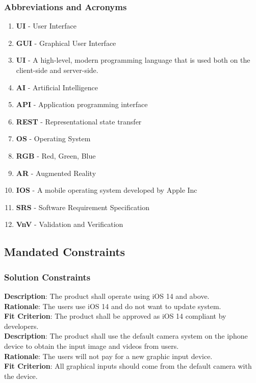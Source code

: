 \documentclass[12pt]{article}
\begin{document}
\subsubsection{Abbreviations and Acronyms}
\begin{enumerate}
\item \textbf{UI} - User Interface
\item \textbf{GUI} - Graphical User Interface
\item \textbf{UI} - A high-level, modern programming language that is used both on the client-side and server-side.
\item \textbf{AI} - Artificial Intelligence
\item \textbf{API} - Application programming interface
\item \textbf{REST} - Representational state transfer
\item \textbf{OS} - Operating System
\item \textbf{RGB} - Red, Green, Blue
\item \textbf{AR} - Augmented Reality
\item \textbf{IOS} - A mobile operating system developed by Apple Inc
\item \textbf{SRS} - Software Requirement Specification
\item \textbf{VnV} - Validation and Verification
\end{enumerate}

\subsection{Mandated Constraints}
\subsubsection{Solution Constraints}
\textbf{Description}: The product shall operate using iOS 14 and above. \\
\textbf{Rationale}: The users use iOS 14 and do not want to update system. \\
\textbf{Fit Criterion}: The product shall be approved as iOS 14 compliant by developers. \\
\newline
\textbf{Description}: The product shall use the default camera system on the iphone device to obtain the input image and videos from users. \\
\textbf{Rationale}: The users will not pay for a new graphic input device. \\
\textbf{Fit Criterion}: All graphical inputs should come from the default camera with the device. \\
\end{document}

